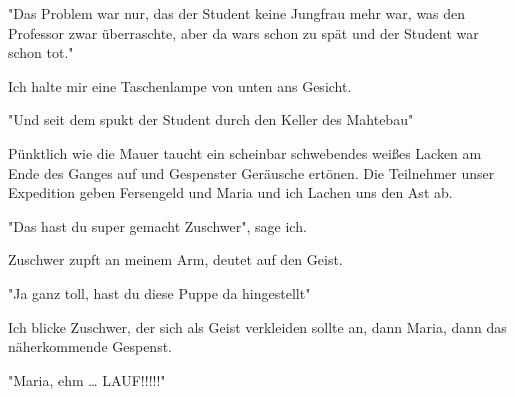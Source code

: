 \documentclass[11pt]{article}
\begin{document}
\begin{center}
"Das Problem war nur, das der Student keine Jungfrau mehr war, was den
Professor zwar überraschte, aber da wars schon zu spät und der Student
war schon tot."
\end{center}
Ich halte mir eine Taschenlampe von unten ans Gesicht.
\begin{center}
"Und seit dem spukt der Student durch den Keller des Mahtebau"
\end{center}
Pünktlich wie die Mauer taucht ein scheinbar schwebendes weißes Lacken
am Ende des Ganges auf und Gespenster Geräusche ertönen.
Die Teilnehmer unser Expedition geben Fersengeld und Maria und ich
Lachen uns den Ast ab. 
\begin{center}
"Das hast du super gemacht Zuschwer", sage ich.
\end{center}
Zuschwer zupft an meinem Arm, deutet auf den Geist.
\begin{center}
"Ja ganz toll, hast du diese Puppe da hingestellt"
\end{center}
Ich blicke Zuschwer, der sich als Geist verkleiden sollte an, dann
Maria, dann das näherkommende Gespenst.
\begin{center}
"Maria, ehm \ldots{} LAUF!!!!!"
\end{center}
\newpage
\end{document}
